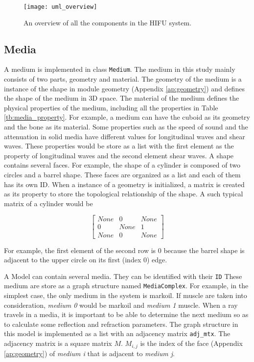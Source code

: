 \begin{figure}[h]
    \centering
    \texttt{[image: uml\_overview]}
    \caption{An overview of all the components in the HIFU system.}
    \label{fig:uml_overview}
\end{figure}

\subsection{Media} \label{sec:Media}
A medium is implemented in class \texttt{Medium}. The medium in this study mainly consists of two parts, geometry and material. The geometry of the medium is a instance of the shape in module geometry (Appendix \ref{ap:geometry}) and defines the shape of the medium in 3D space. The material of the medium defines the physical properties of the medium, including all the properties in Table \ref{tb:media_property}. For example, a medium can have the cuboid as its geometry and the bone as its material. Some properties such as the speed of sound and the attenuation in solid media have different values for longitudinal waves and shear waves. These properties would be store as a list with the first element as the property of longitudinal waves and the second element shear waves. A shape contains several faces. For example, the shape of a cylinder is composed of two circles and a barrel shape. These faces are organized as a list and each of them has its own ID. When a instance of a geometry is initialized, a matrix is created as its property to store the topological relationship of the shape. A such typical matrix of a cylinder would be

\[
\begin{bmatrix}
    None & 0 & None \\
    0 & None & 1 \\
    None & 0 & None
\end{bmatrix}
\]

For example, the first element of the second row is $0$ because the barrel shape is adjacent to the upper circle on its first (index 0) edge.

A Model can contain several media. They can be identified with their \texttt{ID} These medium are store as a graph structure named \texttt{MediaComplex}. For example, in the simplest case, the only medium in the system is markoil. If muscle are taken into consideration, \textit{medium 0} would be markoil and \textit{medium 1} muscle.  When a ray travels in a media, it is important to be able to determine the next medium so as to calculate some reflection and refraction parameters. The graph structure in this model is implemented as a list with an adjacency matrix \texttt{adj\_mtx}. The adjacency matrix is a square matrix $M$. $M_{i,j}$ is the index of the face (Appendix \ref{ap:geometry}) of \textit{medium i} that is adjacent to \textit{medium j}.

